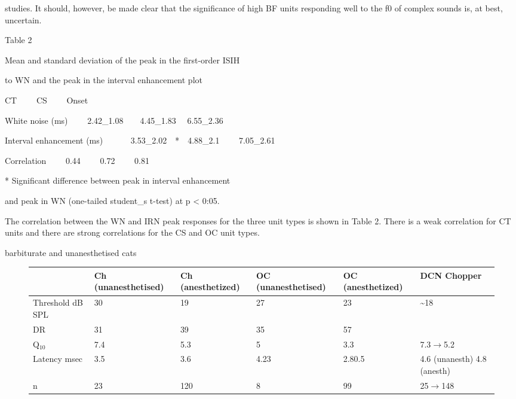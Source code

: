 \documentclass[10pt,a4paper]{article}
\newcommand\textsubscript[1]{\ensuremath{{}_{\text{#1}}}}
\begin{document}
studies. It should, however, be made clear that the significance of high BF
units responding well to the f0 of complex sounds is, at best, uncertain.

Table 2

Mean and standard deviation of the peak in the first-order ISIH

to WN and the peak in the interval enhancement plot

CT \ \ \ \ CS \ \ \ \ Onset

White noise (ms) \ \ \ \ 2.42\_1.08\ \ \ \ 4.45\_1.83 \ \ 6.55\_2.36

Interval enhancement (ms) \ \ \ \ \ \ 3.53\_2.02\ \ *\ \ 4.88\_2.1 \ \ \ \
7.05\_2.61

Correlation \ \ \ \ 0.44 \ \ \ \ 0.72 \ \ \ \ 0.81

* Significant difference between peak in interval enhancement

and peak in WN (one-tailed student\_s t{}-test) at p {\textless} 0:05.

The correlation between the WN and IRN peak responses for the three unit types
is shown in Table 2. There is a weak correlation for CT units and there are
strong correlations for the CS and OC unit types.

\citep{RhodeKettner:1987} barbiturate and unanesthetised cats

\begin{figure}[htp]
  \centering
  \begin{minipage}{19.447cm}
    \begin{flushleft}
      \tablehead{}
      \begin{supertabular}{|m{2.737cm}|m{3.702cm}|m{3.465cm}|m{3.063cm}|m{2.8969998cm}|m{2.402cm}|}
        \hline & Ch (unanesthetised) & Ch (anesthetized) & OC (unanesthetised) &    OC (anesthetized) & DCN Chopper\\\hline
 Threshold dB SPL & 30 & 19 & 27        & 23 & \~{}18\\\hline
 DR & 31 & 39 & 35 & 57 & \\\hline
  Q\textsubscript{10} & 7.4 & 5.3 & 5 & 3.3 &  7.3\ensuremath{\rightarrow}5.2\\\hline 
Latency msec & 3.5 & 3.6 &        4.2{\textpm}3 & 2.8{\textpm}0.5 & 4.6 (unanesth) 4.8 (anesth)\\\hline
 n   & 23 & 120 & 8 & 99 & 25\ensuremath{\rightarrow}148\\\hline
      \end{supertabular}
    \end{flushleft}
  \end{minipage}
\end{figure}
\end{document}
